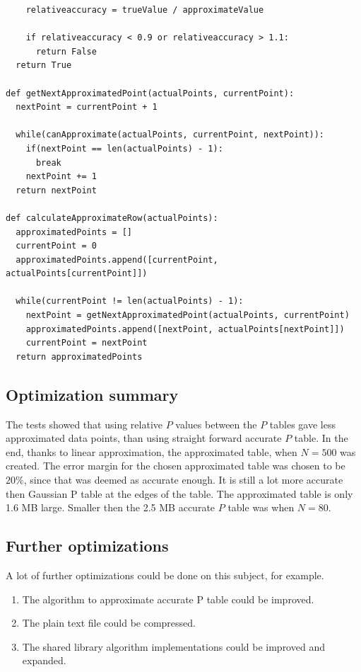 \documentclass[12pt]{article}
\begin{document}
{\begin{lstlisting}
    relativeaccuracy = trueValue / approximateValue

    if relativeaccuracy < 0.9 or relativeaccuracy > 1.1:
      return False
  return True

def getNextApproximatedPoint(actualPoints, currentPoint):
  nextPoint = currentPoint + 1

  while(canApproximate(actualPoints, currentPoint, nextPoint)):
    if(nextPoint == len(actualPoints) - 1):
      break
    nextPoint += 1
  return nextPoint

def calculateApproximateRow(actualPoints):
  approximatedPoints = []
  currentPoint = 0
  approximatedPoints.append([currentPoint, actualPoints[currentPoint]])

  while(currentPoint != len(actualPoints) - 1):
    nextPoint = getNextApproximatedPoint(actualPoints, currentPoint)
    approximatedPoints.append([nextPoint, actualPoints[nextPoint]])
    currentPoint = nextPoint
  return approximatedPoints

\end{lstlisting}

\subsection{Optimization summary}
The tests showed that using relative $P$ values between the $P$ tables gave less approximated data points, than using straight forward accurate $P$ table. In the end, thanks to linear approximation, the approximated table, when $N=500$ was created. The error margin for the chosen approximated table was chosen to be $20\%$, since that was deemed as accurate enough. It is still a lot more accurate then Gaussian P table at the edges of the table. The approximated table is only 1.6 MB large. Smaller then the 2.5 MB accurate $P$ table was when $N=80$.

\subsection{Further optimizations}
A lot of further optimizations could be done on this subject, for example.

\begin{enumerate}
\item The algorithm to approximate accurate P table could be improved.
\item The plain text file could be compressed.
\item The shared library algorithm implementations could be improved and expanded.
\end{enumerate}

}
\end{document}
